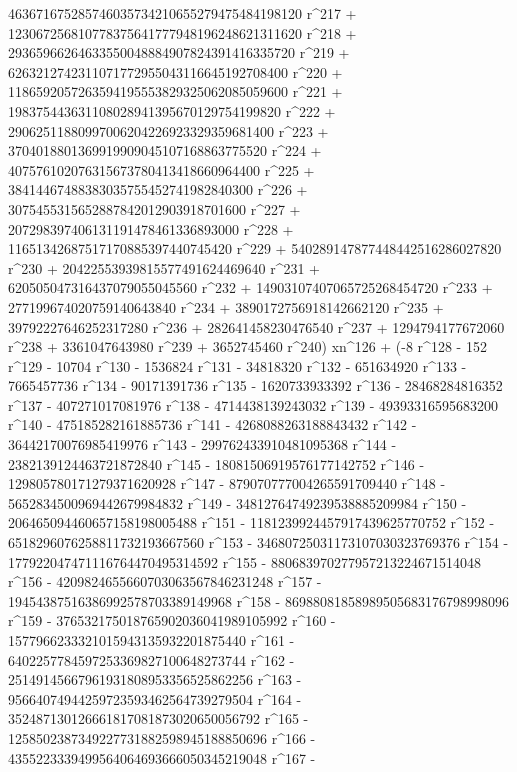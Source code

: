        463671675285746035734210655279475484198120 r^217 + 
       123067256810778375641777948196248621311620 r^218 + 
       29365966264633550048884907824391416335720 r^219 + 
       6263212742311071772955043116645192708400 r^220 + 
       1186592057263594195553829325062085059600 r^221 + 
       198375443631108028941395670129754199820 r^222 + 
       29062511880997006204226923329359681400 r^223 + 
       3704018801369919909045107168863775520 r^224 + 
       407576102076315673780413418660964400 r^225 + 
       38414467488383035755452741982840300 r^226 + 
       3075455315652887842012903918701600 r^227 + 
       207298397406131191478461336893000 r^228 + 
       11651342687517170885397440745420 r^229 + 
       540289147877448442516286027820 r^230 + 
       20422553939815577491624469640 r^231 + 
       620505047316437079055045560 r^232 + 
       14903107407065725268454720 r^233 + 
       277199674020759140643840 r^234 + 
       3890172756918142662120 r^235 + 39792227646252317280 r^236 + 
       282641458230476540 r^237 + 1294794177672060 r^238 + 
       3361047643980 r^239 + 3652745460 r^240) xn^126 + (-8 r^128 - 
       152 r^129 - 10704 r^130 - 1536824 r^131 - 34818320 r^132 - 
       651634920 r^133 - 7665457736 r^134 - 90171391736 r^135 - 
       1620733933392 r^136 - 28468284816352 r^137 - 
       407271017081976 r^138 - 4714438139243032 r^139 - 
       49393316595683200 r^140 - 475185282161885736 r^141 - 
       4268088263188843432 r^142 - 36442170076985419976 r^143 - 
       299762433910481095368 r^144 - 2382139124463721872840 r^145 - 
       18081506919576177142752 r^146 - 
       129805780171279371620928 r^147 - 
       879070777004265591709440 r^148 - 
       5652834500969442679984832 r^149 - 
       34812764749239538885209984 r^150 - 
       206465094460657158198005488 r^151 - 
       1181239924457917439625770752 r^152 - 
       6518296076258811732193667560 r^153 - 
       34680725031173107030323769376 r^154 - 
       177922047471116764470495314592 r^155 - 
       880683970277957213224671514048 r^156 - 
       4209824655660703063567846231248 r^157 - 
       19454387516386992578703389149968 r^158 - 
       86988081858989505683176798998096 r^159 - 
       376532175018765902036041989105992 r^160 - 
       1577966233321015943135932201875440 r^161 - 
       6402257784597253369827100648273744 r^162 - 
       25149145667961931808953356525862256 r^163 - 
       95664074944259723593462564739279504 r^164 - 
       352487130126661817081873020650056792 r^165 - 
       1258502387349227731882598945188850696 r^166 - 
       4355223339499564064693666050345219048 r^167 - 
